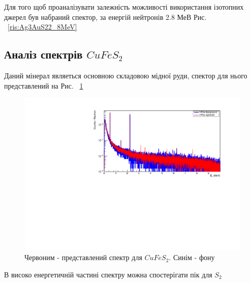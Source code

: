 \documentclass[a4paper, 14pt]{article}
\numberwithin{equation}{section}
\numberwithin{table}{section}
\begin{document}
Для того щоб проаналізувати залежність можливості використання ізотопних джерел був набраний спектор, за енергій нейтронів 2.8 МеВ Рис. ~\ref{ris:Ag3AuS22_8MeV}

\subsection{Аналіз спектрів $CuFeS_2$}
Даний мінерал являеться основною складовою мідної руди, спектор для нього представлений на Рис. ~\ref{ris:CuFeS_2Fon}
\begin{figure}[hbt!]
	\centering \includegraphics[width=1\textwidth]{res/smCuFeS2FonAll.pdf}
	\caption{Червоним - представлений спектр для $CuFeS_2$. Синім - фону} 
	\label{ris:CuFeS_2Fon}	
\end{figure} 	
В високо енергетичній частині спектру можна спостерігати пік для $S_2$
\end{document}

